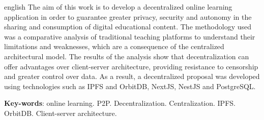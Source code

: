 \begin{resumo}[Abstract]
 \begin{otherlanguage*}{english}
  The aim of this work is to develop a decentralized online learning application in order to guarantee greater privacy, security and autonomy in the sharing and consumption of digital educational content. The methodology used was a comparative analysis of traditional teaching platforms to understand their limitations and weaknesses, which are a consequence of the centralized architectural model. The results of the analysis show that decentralization can offer advantages over client-server architecture, providing resistance to censorship and greater control over data. As a result, a decentralized proposal was developed using technologies such as IPFS and OrbitDB, NextJS, NestJS and PostgreSQL.

   \vspace{\onelineskip}
 
   \noindent 
   \textbf{Key-words}: online learning. P2P. Decentralization. Centralization. IPFS. OrbitDB. Client-server architecture.
 \end{otherlanguage*}
\end{resumo}
